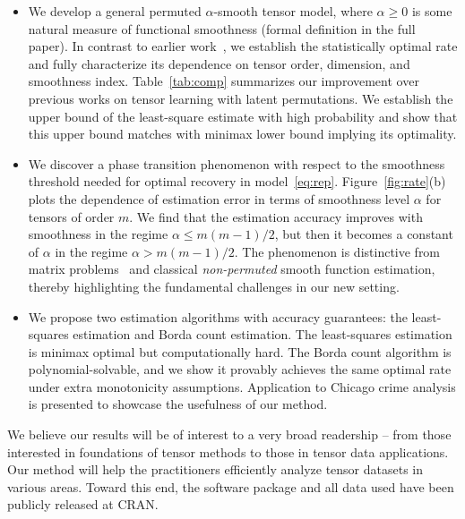 \documentclass[11pt]{article}
\theoremstyle{definition}
\begin{document}
\begin{itemize}[wide,labelwidth=0pt, labelindent=0pt,itemsep=.4ex,topsep=-2pt]
\item We develop a general permuted $\alpha$-smooth tensor model, where $\alpha\geq 0$ is some natural measure of functional smoothness (formal definition in the full paper). In contrast to earlier work~\cite{balasubramanian2021nonparametric,li2019nearest}, we establish the statistically optimal rate and fully characterize its dependence on tensor order, dimension, and smoothness index. Table~\ref{tab:comp} summarizes our improvement over previous works on tensor learning with latent permutations.  We establish the upper bound of the least-square estimate with high probability and show that this upper bound matches with minimax lower bound implying its optimality. 
\vspace{-.2cm}
\item We discover a phase transition phenomenon with respect to the smoothness threshold needed for optimal recovery in model~\eqref{eq:rep}. 
Figure~\ref{fig:rate}(b) plots the dependence of estimation error in terms of smoothness level $\alpha$ for tensors of order $m$. We find that the estimation accuracy improves with smoothness in the regime $\alpha \leq m(m-1)/2$, but then it becomes a constant of $\alpha$ in the regime $ \alpha > m(m-1)/2$. The phenomenon is distinctive from matrix problems~\citep{klopp2017oracle} and classical \emph{non-permuted} smooth function estimation, thereby highlighting the fundamental challenges in our new setting. 
\vspace{-.2cm}
\item We propose two estimation algorithms with accuracy guarantees: the least-squares estimation and Borda count estimation. The least-squares estimation is minimax optimal but computationally hard. The Borda count algorithm is polynomial-solvable, and we show it provably achieves the same optimal rate under extra monotonicity assumptions. Application to Chicago crime analysis is presented to showcase the usefulness of our method. 
\end{itemize}
We believe our results will be of interest to a very broad readership – from those interested in foundations of tensor methods to those in tensor data applications. Our method will help the practitioners efficiently analyze tensor datasets in various areas. Toward this end, the software package and all data used have been publicly released at CRAN.

{\small
\vspace{-.1cm}

}
\end{document}
